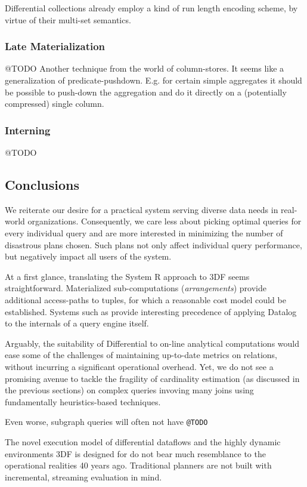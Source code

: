 \documentclass[../index.tex]{subfiles}
\begin{document}
Differential collections already employ a kind of run length encoding
scheme, by virtue of their multi-set semantics.

\subsubsection{Late Materialization}

@TODO
Another technique from the world of column-stores. It seems like a
generalization of predicate-pushdown. E.g. for certain simple
aggregates it should be possible to push-down the aggregation and do
it directly on a (potentially compressed) single column.

\subsubsection{Interning}

@TODO

\subsection{Conclusions}

We reiterate our desire for a practical system serving diverse data
needs in real-world organizations. Consequently, we care less about
picking optimal queries for every individual query and are more
interested in minimizing the number of disastrous plans chosen. Such
plans not only affect individual query performance, but negatively
impact all users of the system.

At a first glance, translating the System R approach to 3DF seems
straightforward. Materialized sub-computations (\emph{arrangements})
provide additional access-paths to tuples, for which a reasonable cost
model could be established. Systems such as \cite{condie2008evita}
provide interesting precedence of applying Datalog to the internals of
a query engine itself.

Arguably, the suitability of Differential to on-line analytical
computations would ease some of the challenges of maintaining
up-to-date metrics on relations, without incurring a significant
operational overhead. Yet, we do not see a promising avenue to tackle
the fragility of cardinality estimation (as discussed in the previous
sections) on complex queries invoving many joins using fundamentally
heuristics-based techniques.

Even worse, subgraph queries will often not have \texttt{@TODO}

The novel execution model of differential dataflows and the highly
dynamic environments 3DF is designed for do not bear much resemblance
to the operational realities 40 years ago. Traditional planners are
not built with incremental, streaming evaluation in mind.
\end{document}
